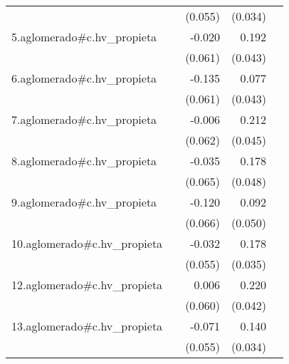 {\begin{longtable}{l*{4}{D{.}{.}{-1}}}
            &                     &     (0.055)         &     (0.034)         &                     \\
\addlinespace
5.aglomerado#c.hv\_propieta&                     &      -0.020         &       0.192\sym{***}&                     \\
            &                     &     (0.061)         &     (0.043)         &                     \\
\addlinespace
6.aglomerado#c.hv\_propieta&                     &      -0.135\sym{*}  &       0.077         &                     \\
            &                     &     (0.061)         &     (0.043)         &                     \\
\addlinespace
7.aglomerado#c.hv\_propieta&                     &      -0.006         &       0.212\sym{***}&                     \\
            &                     &     (0.062)         &     (0.045)         &                     \\
\addlinespace
8.aglomerado#c.hv\_propieta&                     &      -0.035         &       0.178\sym{***}&                     \\
            &                     &     (0.065)         &     (0.048)         &                     \\
\addlinespace
9.aglomerado#c.hv\_propieta&                     &      -0.120         &       0.092         &                     \\
            &                     &     (0.066)         &     (0.050)         &                     \\
\addlinespace
10.aglomerado#c.hv\_propieta&                     &      -0.032         &       0.178\sym{***}&                     \\
            &                     &     (0.055)         &     (0.035)         &                     \\
\addlinespace
12.aglomerado#c.hv\_propieta&                     &       0.006         &       0.220\sym{***}&                     \\
            &                     &     (0.060)         &     (0.042)         &                     \\
\addlinespace
13.aglomerado#c.hv\_propieta&                     &      -0.071         &       0.140\sym{***}&                     \\
            &                     &     (0.055)         &     (0.034)         &                     \\

\end{longtable}}
